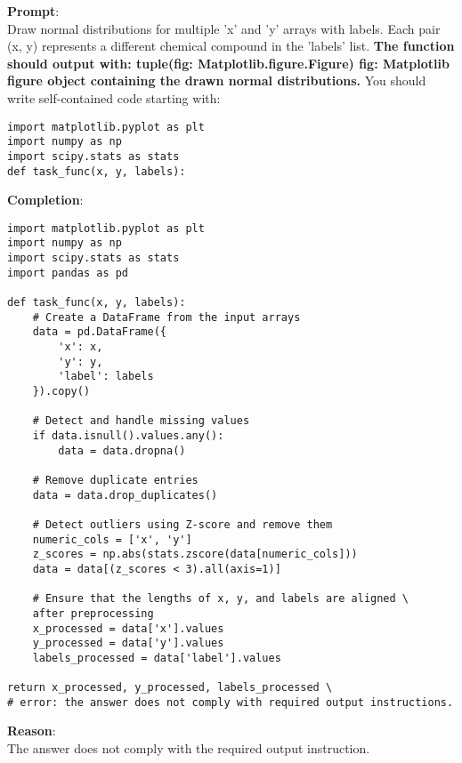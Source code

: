 \onecolumn
\begin{tcolorbox}[colback=blue!5!white, colframe=blue!75!black, title=Failed Example \#1 Generated by o1-mini, text width=\textwidth]
\textbf{Prompt}:\\
Draw normal distributions for multiple 'x' and 'y' arrays with labels. Each pair (x, y) represents a different chemical compound in the 'labels' list. \textbf{The function should output with: tuple(fig: Matplotlib.figure.Figure) fig: Matplotlib figure object containing the drawn normal distributions.} You should write self-contained code starting with:

\begin{verbatim}
import matplotlib.pyplot as plt
import numpy as np
import scipy.stats as stats
def task_func(x, y, labels):
\end{verbatim}

\textbf{Completion}:\\
\begin{verbatim}
import matplotlib.pyplot as plt
import numpy as np
import scipy.stats as stats
import pandas as pd
 
def task_func(x, y, labels):
    # Create a DataFrame from the input arrays
    data = pd.DataFrame({
        'x': x,
        'y': y,
        'label': labels
    }).copy()
   
    # Detect and handle missing values
    if data.isnull().values.any():
        data = data.dropna()
   
    # Remove duplicate entries
    data = data.drop_duplicates()
   
    # Detect outliers using Z-score and remove them
    numeric_cols = ['x', 'y']
    z_scores = np.abs(stats.zscore(data[numeric_cols]))
    data = data[(z_scores < 3).all(axis=1)]
   
    # Ensure that the lengths of x, y, and labels are aligned \ 
    after preprocessing
    x_processed = data['x'].values
    y_processed = data['y'].values
    labels_processed = data['label'].values
   
return x_processed, y_processed, labels_processed \ 
# error: the answer does not comply with required output instructions.
\end{verbatim}

\textbf{Reason}:\\
The answer does not comply with the required output instruction.
\end{tcolorbox}